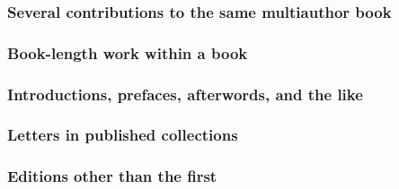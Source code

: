 \documentclass[11pt,letterpaper,oneside]{article}
\begin{document}
\subsubsection{Several contributions to the same multiauthor book}

\begin{citebib}
\item \cite[84--87]{keating1968}
\item \cite[362--70]{lippincott1968}
\item \cite{draper1987}
\item \cite{harrington1987}
\end{citebib}

\subsubsection{Book-length work within a book}

\begin{citebib}
\item \cite{bernard1990a}
\item \cite{updike1995a}
\end{citebib}

\subsubsection{Introductions, prefaces, afterwords, and the like}

\begin{citebib}
\item \cite{morrison2004b.f}
\item \cite{mansfield2000}
\end{citebib}

\subsubsection{Letters in published collections}

\begin{citebib}
\item \cite[133--34]{adams1867}
\item \cite{jackson1676}
\end{citebib}

\setcounter{subsubsection}{112}
\subsubsection{Editions other than the first}
\end{document}
